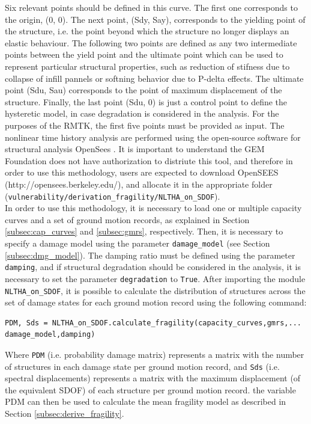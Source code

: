 Six relevant points should be defined in this curve. The first one corresponds to the origin, (0, 0). The next point, (Sdy, Say), corresponds to the yielding point of the structure, i.e. the point beyond which the structure no longer displays an elastic behaviour. The following two points are defined as any two intermediate points between the yield point and the ultimate point which can be used to represent particular structural properties, such as reduction of stifness due to collapse of infill pannels or softning behavior due to P-delta effects. The ultimate point (Sdu, Sau) corresponds to the point of maximum displacement of the structure. Finally, the last point (Sdu, 0) is just a control point to define the hysteretic model, in case degradation is considered in the analysis. For the purposes of the RMTK, the first five points must be provided as input. The nonlinear time history analysis are performed using the open-source software for structural analysis OpenSees \citep{ McKennaEtAl2000}. It is important to understand the GEM Foundation does not have authorization to distriute this tool, and therefore in order to use this methodology, users are expected to download OpenSEES (http://opensees.berkeley.edu/), and allocate it in the appropriate folder (\verb=vulnerability/derivation_fragility/NLTHA_on_SDOF=).\\

In order to use this methodology, it is necessary to load one or multiple capacity curves and a set of ground motion records, as explained in Section \ref{subsec:cap_curves} and \ref{subsec:gmrs}, respectively. Then, it is necessary to specify a damage model using the parameter \verb=damage_model= (see Section \ref{subsec:dmg_model}). The damping ratio must be defined using the parameter \verb=damping=, and if structural degradation should be considered in the analysis, it is necessary to set the parameter \verb=degradation= to \verb=True=. After importing the module \verb=NLTHA_on_SDOF=, it is possible to calculate the distribution of structures across the set of damage states for each ground motion record using the following command:

\begin{Verbatim}[frame=single, commandchars=\\\{\}, samepage=true]
PDM, Sds = NLTHA_on_SDOF.calculate_fragility(capacity_curves,gmrs,...
damage_model,damping)
\end{Verbatim}

Where \verb=PDM= (i.e. probability damage matrix) represents a matrix with the number of structures in each damage state per ground motion record, and \verb=Sds= (i.e. spectral displacements) represents a matrix with the maximum displacement (of the equivalent SDOF) of each structure per ground motion record. the variable PDM can then be used to calculate the mean fragility model as described in Section \ref{subsec:derive_fragility}.



